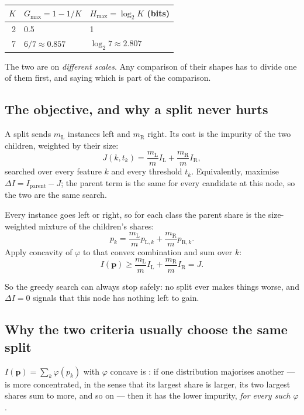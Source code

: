 \documentclass[11pt,a4paper]{article}
\begin{document}
\begin{center}
\small
\begin{tabular}{rll}
\toprule
$K$ & $G_{\max} = 1 - 1/K$ & $H_{\max} = \log_2 K$ (bits) \\
\midrule
2 & 0.5 & 1 \\
7 & $6/7 \approx 0.857$ & $\log_2 7 \approx 2.807$ \\
\bottomrule
\end{tabular}
\end{center}

The two are on \emph{different scales}. Any comparison of their shapes has to
divide one of them first, and saying which is part of the comparison.

\subsection{The objective, and why a split never hurts}

A split sends $m_{\text{L}}$ instances left and $m_{\text{R}}$ right. Its cost
is the impurity of the two children, weighted by their size:
\[ J(k, t_k) = \frac{m_{\text{L}}}{m}I_{\text{L}}
             + \frac{m_{\text{R}}}{m}I_{\text{R}}, \]
searched over every feature $k$ and every threshold $t_k$. Equivalently,
maximise $\Delta I = I_{\text{parent}} - J$; the parent term is the same for
every candidate at this node, so the two are the same search.

\begin{derivbox}[title={$\Delta I \ge 0$, always}]
Every instance goes left or right, so for each class the parent share is the
size-weighted mixture of the children's shares:
\[ p_k = \frac{m_{\text{L}}}{m}p_{\text{L},k}
       + \frac{m_{\text{R}}}{m}p_{\text{R},k}. \]
Apply concavity of $\varphi$ to that convex combination and sum over $k$:
\[ I(\mathbf{p}) \ge \frac{m_{\text{L}}}{m}I_{\text{L}}
                   + \frac{m_{\text{R}}}{m}I_{\text{R}} = J. \]
\end{derivbox}

So the greedy search can always stop safely: no split ever makes things worse,
and $\Delta I = 0$ signals that this node has nothing left to gain.

\subsection{Why the two criteria usually choose the same split}

$I(\mathbf{p}) = \sum_k\varphi(p_k)$ with $\varphi$ concave is
: if one distribution majorises another --- is more
concentrated, in the sense that its largest share is larger, its two largest
shares sum to more, and so on --- then it has the lower impurity, \emph{for
every such $\varphi$}.
\end{document}
